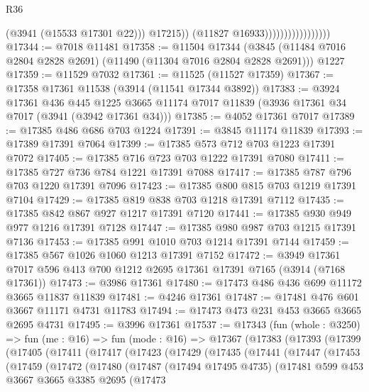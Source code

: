 \begin{lexlean}{R36}
\begin{coremodule}
                                          (@3941 (@15533 @17301 @22)))
                                        @17215))
                                    (@11827 @16933)))))))))))))))))
@17344 := @7018 @11481
@17358 := @11504
    @17344
    (@3845 (@11484 @7016 @2804 @2828 @2691) (@11490 (@11304 @7016 @2804 @2828 @2691)))
    @1227
@17359 := @11529 @7032
@17361 := @11525 (@11527 @17359)
@17367 := @17358 @17361 @11538 (@3914 (@11541 @17344 @3892))
@17383 := @3924
    @17361
    @436
    @445
    @1225
    @3665
    @11174
    @7017
    @11839
    (@3936 @17361 @34 @7017 (@3941 (@3942 @17361 @34)))
@17385 := @4052 @17361 @7017
@17389 := @17385 @486 @686 @703 @1224
@17391 := @3845 @11174 @11839
@17393 := @17389 @17391 @7064
@17399 := @17385 @573 @712 @703 @1223 @17391 @7072
@17405 := @17385 @716 @723 @703 @1222 @17391 @7080
@17411 := @17385 @727 @736 @784 @1221 @17391 @7088
@17417 := @17385 @787 @796 @703 @1220 @17391 @7096
@17423 := @17385 @800 @815 @703 @1219 @17391 @7104
@17429 := @17385 @819 @838 @703 @1218 @17391 @7112
@17435 := @17385 @842 @867 @927 @1217 @17391 @7120
@17441 := @17385 @930 @949 @977 @1216 @17391 @7128
@17447 := @17385 @980 @987 @703 @1215 @17391 @7136
@17453 := @17385 @991 @1010 @703 @1214 @17391 @7144
@17459 := @17385 @567 @1026 @1060 @1213 @17391 @7152
@17472 := @3949 @17361 @7017 @596 @413 @700 @1212 @2695 @17361 @17391 @7165 (@3914 (@7168 @17361))
@17473 := @3986 @17361
@17480 := @17473 @486 @436 @699 @11172 @3665 @11837 @11839
@17481 := @4246 @17361
@17487 := @17481 @476 @601 @3667 @11171 @4731 @11783
@17494 := @17473 @473 @231 @453 @3665 @3665 @2695 @4731
@17495 := @3996 @17361
@17537 := @17343
    (fun (whole : @3250) =>
    fun (me : @16) =>
    fun (mode : @16) =>
    @17367
      (@17383
        (@17393
          (@17399
            (@17405
              (@17411
                (@17417
                  (@17423
                    (@17429
                      (@17435
                        (@17441
                          (@17447
                            (@17453
                              (@17459
                                (@17472
                                  (@17480
                                    (@17487
                                      (@17494 @17495 @4735)
                                      (@17481
                                        @599
                                        @453
                                        @3667
                                        @3665
                                        @3385
                                        @2695
                                        (@17473

\end{coremodule}
\end{lexlean}
